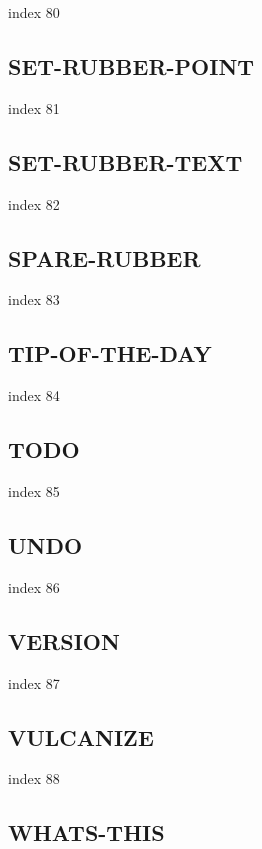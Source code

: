 \documentclass[a4paper]{report}
\begin{document}
index 80

\subsection{SET-RUBBER-POINT}

index 81

\subsection{SET-RUBBER-TEXT}

index 82

\subsection{SPARE-RUBBER}

index 83

\subsection{TIP-OF-THE-DAY}

index 84

\subsection{TODO}

 index 85

\subsection{UNDO}

 index 86

\subsection{VERSION}

index 87

\subsection{VULCANIZE}

index 88

\subsection{WHATS-THIS}
\end{document}
